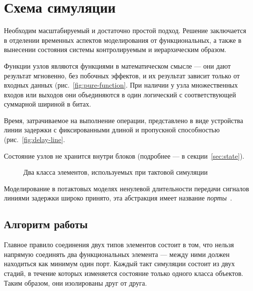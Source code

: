 \section{Схема симуляции}

Необходим масштабируемый и достаточно простой подход. Решение заключается в отделении временных аспектов моделирования от функциональных, а также в вынесении состояния системы контролируемым и иерархическим образом. 

\begin{itemize*}
    \item Функции узлов являются функциями в математическом смысле — они дают результат мгновенно, без побочных эффектов, и их результат зависит только от входных данных (рис.~\ref{fig:pure-function}. При наличии у узла множественных входов или выходов они объединяются в один логический с соответствующей суммарной шириной в битах.
    \item Время, затрачиваемое на выполнение операции, представлено в виде устройства линии задержки с фиксированными длиной и пропускной способностью (рис.~\ref{fig:delay-line}.
    \item Состояние узлов не хранится внутри блоков (подробнее — в секции~\ref{sec:state}).
\end{itemize*}

\begin{figure}[htbp]
\centering
{}
\caption{Два класса элементов, используемых при тактовой симуляции}
\end{figure}

Моделирование в потактовых моделях ненулевой длительности передачи сигналов линиями задержки широко принято, эта абстракция имеет название \textit{порты}~\cite{asim}.

\subsection{Алгоритм работы}

Главное правило соединения двух типов элементов состоит в том, что нельзя напрямую соединять два функциональных элемента — между ними должен находиться как минимум один порт. Каждый такт симуляции состоит из двух стадий, в течение которых изменяется состояние только одного класса объектов. Таким образом, они изолированы друг от друга.

